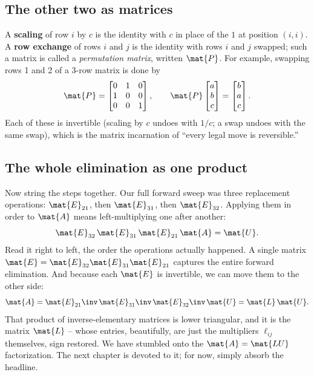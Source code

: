 \subsection{The other two as matrices}

A \textbf{scaling} of row $i$ by $c$ is the identity with $c$ in place of the
$1$ at position $(i,i)$. A \textbf{row exchange} of rows $i$ and $j$ is the
identity with rows $i$ and $j$ swapped; such a matrix is called a
\emph{permutation matrix}, written $\mat{P}$. For example, swapping rows 1 and 2
of a $3$-row matrix is done by
\[
\mat{P}=\begin{bmatrix}0&1&0\\1&0&0\\0&0&1\end{bmatrix},
\qquad
\mat{P}\begin{bmatrix}a\\b\\c\end{bmatrix}
=\begin{bmatrix}b\\a\\c\end{bmatrix}.
\]
Each of these is invertible (scaling by $c$ undoes with $1/c$; a swap undoes with
the same swap), which is the matrix incarnation of ``every legal move is
reversible.''

\subsection{The whole elimination as one product}

Now string the steps together. Our full forward sweep was three replacement
operations: $\mat{E}_{21}$, then $\mat{E}_{31}$, then $\mat{E}_{32}$. Applying
them in order to $\mat{A}$ means left-multiplying one after another:
\[
\mat{E}_{32}\,\mat{E}_{31}\,\mat{E}_{21}\,\mat{A} = \mat{U}.
\]
Read it right to left, the order the operations actually happened. A single
matrix $\mat{E}=\mat{E}_{32}\mat{E}_{31}\mat{E}_{21}$ captures the entire forward
elimination. And because each $\mat{E}$ is invertible, we can move them to the
other side:
\[
\mat{A} = \mat{E}_{21}\inv\,\mat{E}_{31}\inv\,\mat{E}_{32}\inv\,\mat{U}
= \mat{L}\,\mat{U}.
\]
That product of inverse-elementary matrices is lower triangular, and it is the
matrix $\mat{L}$ -- whose entries, beautifully, are just the multipliers
$\ell_{ij}$ themselves, sign restored. We have stumbled onto the
$\mat{A}=\mat{LU}$ factorization. The next chapter is devoted to it; for now,
simply absorb the headline.

